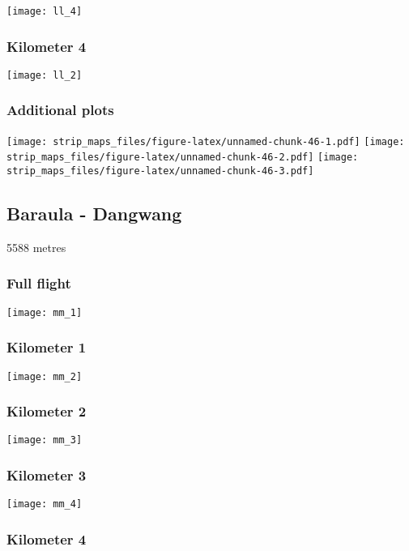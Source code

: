 \documentclass[]{article}
\begin{document}
\texttt{[image: ll\_4]}

\subsubsection{Kilometer 4}\label{kilometer-4-36}

\texttt{[image: ll\_2]}

\subsubsection{Additional plots}\label{additional-plots-37}

\texttt{[image: strip\_maps\_files/figure-latex/unnamed-chunk-46-1.pdf]}
\texttt{[image: strip\_maps\_files/figure-latex/unnamed-chunk-46-2.pdf]}
\texttt{[image: strip\_maps\_files/figure-latex/unnamed-chunk-46-3.pdf]}

\newpage

\subsection{Baraula - Dangwang}\label{baraula---dangwang}

5588 metres

\subsubsection{Full flight}\label{full-flight-38}

\texttt{[image: mm\_1]}

\subsubsection{Kilometer 1}\label{kilometer-1-38}

\texttt{[image: mm\_2]}

\subsubsection{Kilometer 2}\label{kilometer-2-38}

\texttt{[image: mm\_3]}

\subsubsection{Kilometer 3}\label{kilometer-3-38}

\texttt{[image: mm\_4]}

\subsubsection{Kilometer 4}\label{kilometer-4-37}
\end{document}
